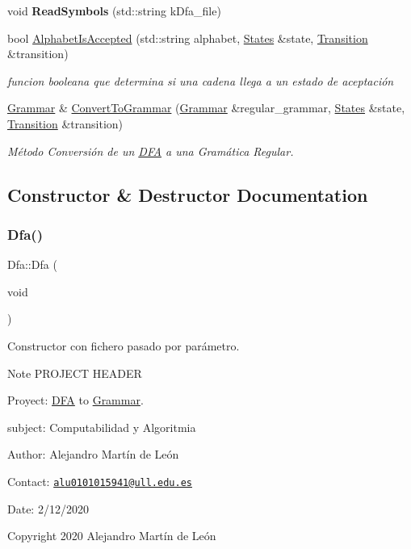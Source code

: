 \begin{DoxyCompactItemize}
\mbox{\label{classDfa_ac596e302028cb885e1a8eae2f1f60e69}} 
void {\bfseries Read\+Symbols} (std\+::string k\+Dfa\+\_\+file)
\item 
\mbox{\label{classDfa_a0de3553aca8cf0329bf12a7b1acaa291}} 
bool \hyperlink{classDfa_a0de3553aca8cf0329bf12a7b1acaa291}{Alphabet\+Is\+Accepted} (std\+::string alphabet, \hyperlink{classStates}{States} \&state, \hyperlink{classTransition}{Transition} \&transition)
\begin{DoxyCompactList}\small\item\em funcion booleana que determina si una cadena llega a un estado de aceptación \end{DoxyCompactList}\item 
\hyperlink{classGrammar}{Grammar} \& \hyperlink{classDfa_a9b9e4f4e3ef305932304aeadb10248b3}{Convert\+To\+Grammar} (\hyperlink{classGrammar}{Grammar} \&regular\+\_\+grammar, \hyperlink{classStates}{States} \&state, \hyperlink{classTransition}{Transition} \&transition)
\begin{DoxyCompactList}\small\item\em Método Conversión de un \hyperlink{classDFA}{D\+FA} a una Gramática Regular. \end{DoxyCompactList}\end{DoxyCompactItemize}


\subsection{Constructor \& Destructor Documentation}
\mbox{\label{classDfa_a89c2bffef86525363c275b3fe60fc57f}} 
\subsubsection{\texorpdfstring{Dfa()}{Dfa()}}
{\footnotesize\ttfamily Dfa\+::\+Dfa (\begin{DoxyParamCaption}\item[{void}]{ }\end{DoxyParamCaption})}



Constructor con fichero pasado por parámetro. 

\begin{DoxyNote}{Note}
P\+R\+O\+J\+E\+CT H\+E\+A\+D\+ER 

Proyect\+: \hyperlink{classDFA}{D\+FA} to \hyperlink{classGrammar}{Grammar}. 

subject\+: Computabilidad y Algoritmia 

Author\+: Alejandro Martín de León 

Contact\+: \href{mailto:alu0101015941@ull.edu.es}{\tt alu0101015941@ull.\+edu.\+es} 

Date\+: 2/12/2020 

Copyright 2020 Alejandro Martín de León 
\end{DoxyNote}


